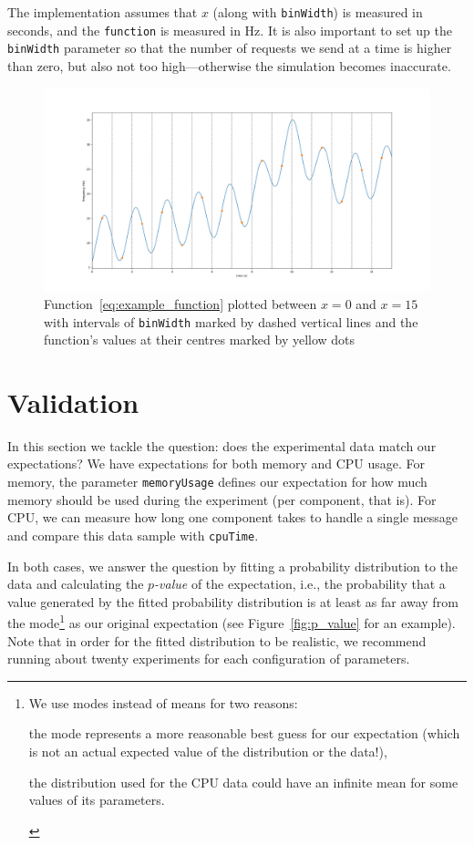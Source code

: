 \documentclass{article}
\begin{document}
The implementation assumes that $x$ (along with \texttt{binWidth}) is measured
in seconds, and the \texttt{function} is measured in \si{\hertz}. It is also
important to set up the \texttt{binWidth} parameter so that the number of
requests we send at a time is higher than zero, but also not too
high---otherwise the simulation becomes inaccurate.

\begin{figure}
  \centering
  \includegraphics[width=\textwidth]{../plots/functional_workload.png}
  \caption{Function~\eqref{eq:example_function} plotted between $x=0$ and
    $x=15$ with intervals of \texttt{binWidth} marked by dashed vertical lines
    and the function's values at their centres marked by yellow dots}
  \label{fig:functional_workload}
\end{figure}

\section{Validation} \label{sec:validation}

In this section we tackle the question: does the experimental data match our
expectations? We have expectations for both memory and CPU usage. For memory,
the parameter \texttt{memoryUsage} defines our expectation for how much memory
should be used during the experiment (per component, that is). For CPU, we can
measure how long one component takes to handle a single message and compare this
data sample with \texttt{cpuTime}.

In both cases, we answer the question by fitting a probability distribution to
the data and calculating the \emph{$p$-value} of the expectation, i.e., the
probability that a value generated by the fitted probability distribution is at
least as far away from the mode\footnote{We use modes instead of means for two
  reasons:
  \begin{itemize*}
  \item the mode represents a more reasonable best guess for our expectation
    (which is not an actual expected value of the distribution or the data!),
  \item the distribution used for the CPU data could have an infinite mean for
    some values of its parameters.
  \end{itemize*}} as our original expectation (see Figure~\ref{fig:p_value} for
an example). Note that in order for the fitted distribution to be realistic, we
recommend running about twenty experiments for each configuration of parameters.
\end{document}
